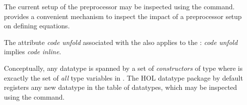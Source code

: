 \begin{isabellebody}
\begin{isamarkuptext}
  \noindent The current setup of the preprocessor may be inspected using
  the \hyperlink{command.print-codesetup}{\mbox{}} command.
  \hyperlink{command.code-thms}{\mbox{}} provides a convenient
  mechanism to inspect the impact of a preprocessor setup
  on defining equations.

  \begin{warn}
    The attribute \emph{code unfold}
    associated with the  also applies to
    the :
    \emph{code unfold} implies \emph{code inline}.
  \end{warn}%
\end{isamarkuptext}%
\isamarkuptrue%
%
\isamarkuptrue%
%
\begin{isamarkuptext}%
Conceptually, any datatype is spanned by a set of
  \emph{constructors} of type 
  where  is excactly the set of \emph{all}
  type variables in \isa{{\isasymtau}}.  The HOL datatype package
  by default registers any new datatype in the table
  of datatypes, which may be inspected using
  the \hyperlink{command.print-codesetup}{\mbox{}} command.


\end{isamarkuptext}
\end{isabellebody}

